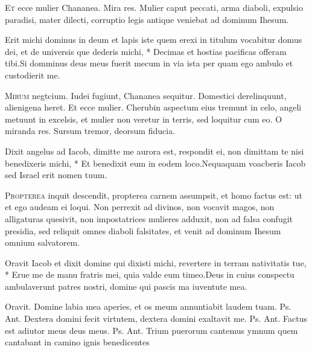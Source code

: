 \begin{multicols*}{2}
 
\lettrine[lines=2]{\zallmancaps \color{Blue} E}{t} ecce mulier Chananea. Mira res. Mulier caput peccati, arma diaboli, expulsio paradisi, mater dilecti, corruptio legis antique veniebat ad dominum Ihesum.
\begin{responsory}
{Erit michi dominus in deum et lapis iste quem erexi in titulum vocabitur domus dei, et de universis que dederis michi, * Decimas et hostias pacificas offeram tibi.}{Si domminus deus meus fuerit mecum in via ista per quam ego ambulo et custodierit me.}
\end{responsory}
\lettrine[lines=2]{\zallmancaps \color{Red} M}{irum} negtcium. Iudei fugiunt, Chananea sequitur. Domestici derelinquunt, alienigena heret. Et ecce mulier. Cherubin aspectum eius tremunt in celo, angeli metuunt in excelsis, et mulier non veretur in terris, sed loquitur cum eo. O miranda res. Sursum tremor, deorsum fiducia.
\begin{responsory}
{Dixit angelus ad Iacob, dimitte me aurora est, respondit ei, non dimittam te nisi benedixeris michi, * Et benedixit eum in eodem loco.}{Nequaquam voacberis Iacob sed Israel erit nomen tuum.}
\end{responsory}
\lettrine[lines=2]{\zallmancaps \color{Blue} P}{ropterea} inquit descendit, propterea carnem assumpsit, et homo factus est: ut et ego audeam ei loqui. Non perrexit ad divinos, non vocavit magos, non alligaturas quesivit, non impostatrices mulieres adduxit, non ad falsa confugit presidia, sed reliquit omnes diaboli falsitates, et venit ad dominum Ihesum omnium salvatorem.
\begin{responsory-doxology}
{Oravit Iacob et dixit domine qui dixisti michi, revertere in terram nativitatis tue, * Erue me de manu fratris mei, quia valde eum timeo.}{Deus in cuius conspectu ambulaverunt patres nostri, domine qui pascis ma iuventute mea.}
\end{responsory-doxology}
{\color{Red} Oravit.}
 Domine labia mea aperies, et os meum annuntiabit laudem tuam. {\color{Red} Ps.}  {\color{Red} Ant.} Dextera domini fecit virtutem, dextera domini exaltavit me. {\color{Red} Ps.}  {\color{Red} Ant.} Factus est adiutor meus deus meus. {\color{Red} Ps.}  {\color{Red} Ant.} Trium puerorum cantemus ymnum quem cantabant in camino ignis benedicentes

\end{multicols*}
